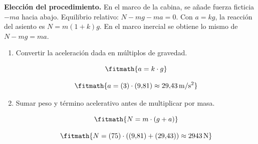 \noindent\textbf{Elección del procedimiento.} En el marco de la cabina, se añade fuerza ficticia $-ma$ hacia abajo. Equilibrio relativo: $N-mg-ma=0$. Con $a=kg$, la reacción del asiento es $N=m(1+k)g$. En el marco inercial se obtiene lo mismo de $N-mg=ma$.

\begin{enumerate}

\item Convertir la aceleración dada en múltiplos de gravedad.

\[\fitmath{a=k\cdot g}\]

\[\fitmath{a=(3)\cdot (9{,}81)\approx 29{,}43\,\mathrm{m/s^{2}}}\]

\item Sumar peso y término acelerativo antes de multiplicar por masa.

\[\fitmath{N=m\cdot \left(g+a\right)}\]

\[\fitmath{N=(75)\cdot \left((9{,}81)+(29{,}43)\right)\approx 2943\,\mathrm{N}}\]

\end{enumerate}
